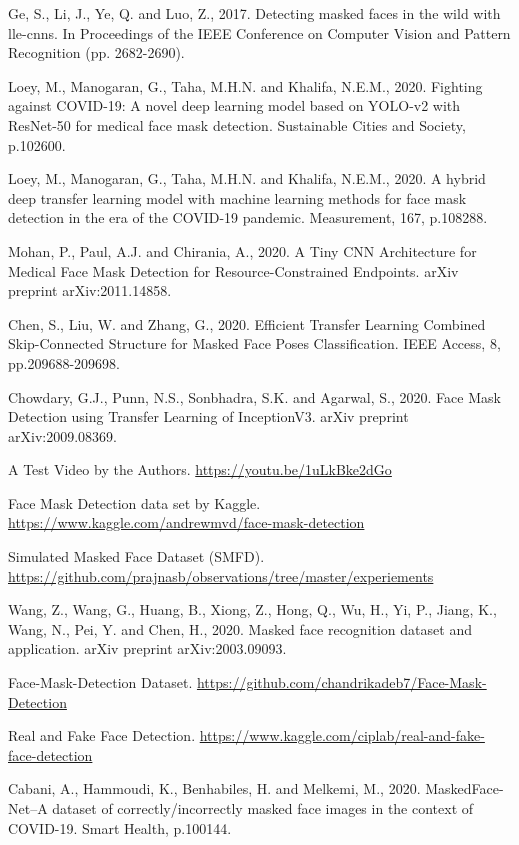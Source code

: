 \documentclass{svproc}
\begin{document}
%
%
\begin{thebibliography}{6}
%
Ge, S., Li, J., Ye, Q. and Luo, Z., 2017. Detecting masked faces in the wild with lle-cnns. In Proceedings of the IEEE Conference on Computer Vision and Pattern Recognition (pp. 2682-2690).

Loey, M., Manogaran, G., Taha, M.H.N. and Khalifa, N.E.M., 2020. Fighting against COVID-19: A novel deep learning model based on YOLO-v2 with ResNet-50 for medical face mask detection. Sustainable Cities and Society, p.102600.

Loey, M., Manogaran, G., Taha, M.H.N. and Khalifa, N.E.M., 2020. A hybrid deep transfer learning model with machine learning methods for face mask detection in the era of the COVID-19 pandemic. Measurement, 167, p.108288.

Mohan, P., Paul, A.J. and Chirania, A., 2020. A Tiny CNN Architecture for Medical Face Mask Detection for Resource-Constrained Endpoints. arXiv preprint arXiv:2011.14858.

Chen, S., Liu, W. and Zhang, G., 2020. Efficient Transfer Learning Combined Skip-Connected Structure for Masked Face Poses Classification. IEEE Access, 8, pp.209688-209698.

Chowdary, G.J., Punn, N.S., Sonbhadra, S.K. and Agarwal, S., 2020. Face Mask Detection using Transfer Learning of InceptionV3. arXiv preprint arXiv:2009.08369.

A Test Video by the Authors. \url{https://youtu.be/1uLkBke2dGo}

Face Mask Detection data set by Kaggle. \url{https://www.kaggle.com/andrewmvd/face-mask-detection}

Simulated Masked Face Dataset (SMFD). \url{https://github.com/prajnasb/observations/tree/master/experiements}

Wang, Z., Wang, G., Huang, B., Xiong, Z., Hong, Q., Wu, H., Yi, P., Jiang, K., Wang, N., Pei, Y. and Chen, H., 2020. Masked face recognition dataset and application. arXiv preprint arXiv:2003.09093.

 Face-Mask-Detection Dataset. \url{https://github.com/chandrikadeb7/Face-Mask-Detection}

Real and Fake Face Detection. \url{https://www.kaggle.com/ciplab/real-and-fake-face-detection}

Cabani, A., Hammoudi, K., Benhabiles, H. and Melkemi, M., 2020. MaskedFace-Net–A dataset of correctly/incorrectly masked face images in the context of COVID-19. Smart Health, p.100144.

\end{thebibliography}
\end{document}
